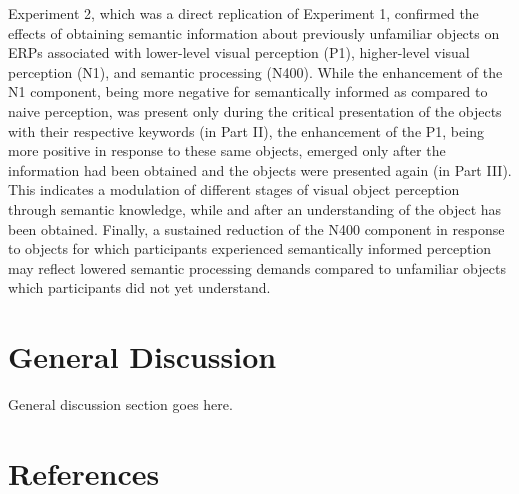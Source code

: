 \documentclass[
  english,
  man,11pt,floatsintext]{apa7}
\begin{document}
Experiment 2, which was a direct replication of Experiment 1, confirmed the effects of obtaining semantic information about previously unfamiliar objects on ERPs associated with lower-level visual perception (P1), higher-level visual perception (N1), and semantic processing (N400). While the enhancement of the N1 component, being more negative for semantically informed as compared to naive perception, was present only during the critical presentation of the objects with their respective keywords (in Part II), the enhancement of the P1, being more positive in response to these same objects, emerged only after the information had been obtained and the objects were presented again (in Part III). This indicates a modulation of different stages of visual object perception through semantic knowledge, while and after an understanding of the object has been obtained. Finally, a sustained reduction of the N400 component in response to objects for which participants experienced semantically informed perception may reflect lowered semantic processing demands compared to unfamiliar objects which participants did not yet understand.

\hypertarget{general-discussion}{%
\section{General Discussion}\label{general-discussion}}

General discussion section goes here.

\newpage

\hypertarget{references}{%
\section{References}\label{references}}

\setlength{\parindent}{-0.5in}
\end{document}
